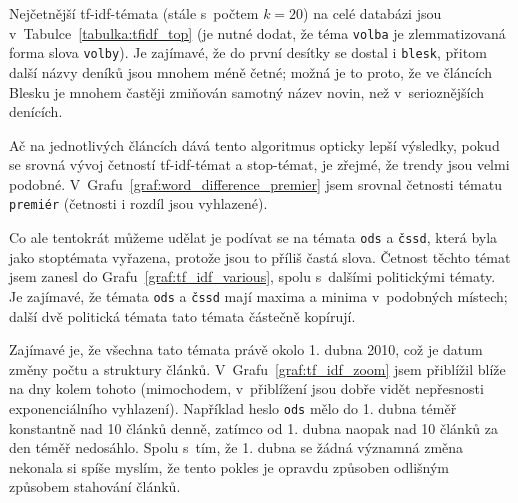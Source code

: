 \documentclass[12pt,a4paper]{report}
\begin{document}

Nejčetnější tf-idf-témata (stále s~počtem $k=20$) na celé databázi jsou v~Tabulce~\ref{tabulka:tfidf_top} (je nutné dodat, že téma \texttt{volba} je zlemmatizovaná forma slova \texttt{volby}). Je zajímavé, že do první desítky se dostal i \texttt{blesk}, přitom další názvy deníků jsou mnohem méně četné; možná je to proto, že ve článcích Blesku je mnohem častěji zmiňován samotný název novin, než v~serioznějších denících.



Ač na jednotlivých článcích dává tento algoritmus opticky lepší výsledky, pokud se srovná vývoj četností tf-idf-témat a stop-témat, je zřejmé, že trendy jsou velmi podobné. V~Grafu~\ref{graf:word_difference_premier} jsem srovnal četnosti tématu \texttt{premiér} (četnosti i rozdíl jsou vyhlazené). 





Co ale tentokrát můžeme udělat je podívat se  na témata \texttt{ods} a \texttt{čssd}, která byla jako stoptémata vyřazena, protože jsou to příliš častá slova. Četnost těchto témat jsem zanesl do Grafu~\ref{graf:tf_idf_various}, spolu s~dalšími politickými tématy. Je zajímavé, že témata \texttt{ods} a \texttt{čssd} mají maxima a minima v~podobných místech; další dvě politická témata tato témata částečně kopírují. 

Zajímavé je, že všechna tato témata  právě okolo 1. dubna 2010, což je datum změny počtu a struktury článků. V~Grafu~\ref{graf:tf_idf_zoom} jsem přiblížil blíže na dny kolem tohoto  (mimochodem, v~přiblížení jsou dobře vidět nepřesnosti exponenciálního vyhlazení). Například heslo \texttt{ods} mělo do 1. dubna téměř konstantně nad 10 článků denně, zatímco od 1. dubna naopak nad 10 článků za den téměř nedosáhlo. Spolu s~tím, že 1. dubna se žádná významná změna nekonala si spíše myslím, že tento pokles je opravdu způsoben odlišným způsobem stahování článků.
\end{document}

